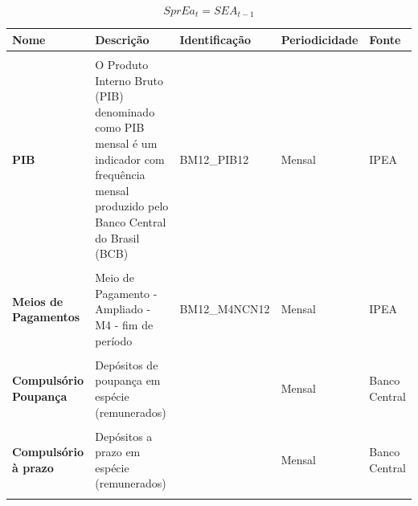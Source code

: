 \documentclass[12pt,12pt,openright,oneside,a4paper,chapter=TITLE,section=TITLE,subsection=TITLE,subsubsection=TITLE,english,french,spanish,portugues,sumario=tradicional]{abntex2}
\begin{document}
\[
SprEa_{t} = SEA_{t-1}
\]

\begin{table}[H]
\centering\begingroup\fontsize{10}{12}\selectfont

\begin{tabular}[t]{>{\raggedright\arraybackslash}p{2cm}>{\raggedright\arraybackslash}p{4cm}>{\raggedright\arraybackslash}p{2cm}>{\raggedright\arraybackslash}p{2cm}>{\raggedright\arraybackslash}p{2cm}}
\toprule
Nome & Descrição & Identificação & Periodicidade & Fonte\\
\midrule
\textbf{\cellcolor{gray!6}{Demonstrações Financeiras}} & \cellcolor{gray!6}{Balancetes (IFs e Conglomerados)} & \cellcolor{gray!6}{370} & \cellcolor{gray!6}{Mensal} & \cellcolor{gray!6}{Banco Central}\\
\textbf{PIB} & O Produto Interno Bruto (PIB) denominado como PIB mensal é um indicador com frequência mensal produzido pelo Banco Central do Brasil (BCB) & BM12\_PIB12 & Mensal & IPEA\\
\textbf{\cellcolor{gray!6}{Selic Over}} & \cellcolor{gray!6}{Taxa de juros apurada nas operações de empréstimos de um dia entre as instituições financeiras que utilizam títulos públicos federais como garantia} & \cellcolor{gray!6}{BM12\_TJOVER12} & \cellcolor{gray!6}{Mensal} & \cellcolor{gray!6}{Banco Central}\\
\textbf{Meios de Pagamentos} & Meio de Pagamento - Ampliado - M4 - fim de período & BM12\_M4NCN12 & Mensal & IPEA\\
\textbf{\cellcolor{gray!6}{IPCA}} & \cellcolor{gray!6}{IPCA Geral} & \cellcolor{gray!6}{PRECOS12\_IPCAG12} & \cellcolor{gray!6}{Mensal} & \cellcolor{gray!6}{IPEA}\\
\addlinespace
\textbf{Compulsório Poupança} & Depósitos de poupança em espécie (remunerados) & 1848 & Mensal & Banco Central\\
\textbf{\cellcolor{gray!6}{Compulsório à vista}} & \cellcolor{gray!6}{Recursos à vista em espécie (não remunerados)} & \cellcolor{gray!6}{1849} & \cellcolor{gray!6}{Mensal} & \cellcolor{gray!6}{Banco Central}\\
\textbf{Compulsório à prazo} & Depósitos a prazo em espécie (remunerados) & 1850 & Mensal & Banco Central\\
\textbf{\cellcolor{gray!6}{Base Monetária Ampliada}} & \cellcolor{gray!6}{Base Monetária Ampliada (saldo em final de período)} & \cellcolor{gray!6}{1833} & \cellcolor{gray!6}{Mensal} & \cellcolor{gray!6}{Banco Central}\\
\bottomrule
\end{tabular}
\endgroup{}
\end{table}
\end{document}
